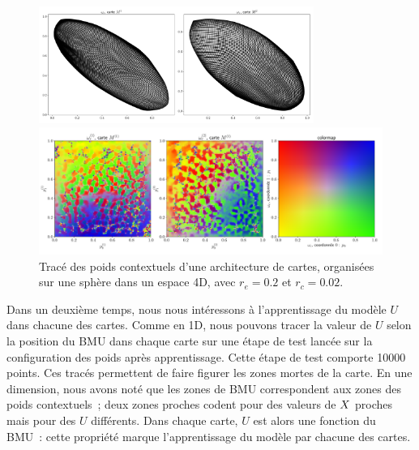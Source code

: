 \documentclass[../main]{subfiles}
\begin{document}
\begin{figure}
	\begin{minipage}{\textwidth}
		\centering\includegraphics[width=0.8\textwidth]{we_rc002_afterbug.pdf}
	\end{minipage}
	\begin{minipage}{\textwidth}
		\centering\includegraphics[width=\textwidth]{wc_rc002_afterbug_nopoints.pdf}
		\caption{Tracé des poids contextuels d'une architecture de cartes, organisées sur une sphère dans un espace 4D, avec $r_e =0.2$ et $r_c = 0.02$.
		\label{fig:2som_s_002_wc}}
	\end{minipage}
\end{figure}

Dans un deuxième temps, nous nous intéressons à l'apprentissage du modèle $U$ dans chacune des cartes. Comme en 1D, nous pouvons tracer la valeur de $U$ selon la position du BMU dans chaque carte sur une étape de test lancée sur la configuration des poids après apprentissage. Cette étape de test comporte 10000 points.
Ces tracés permettent de faire figurer les zones mortes de la carte. En une dimension, nous avons noté que les zones de BMU correspondent aux zones des poids contextuels~; deux zones proches codent pour des valeurs de $X$ proches mais pour des $U$ différents. Dans chaque carte, $U$ est alors une fonction du BMU~: cette propriété marque l'apprentissage du modèle par chacune des cartes. 
\end{document}

